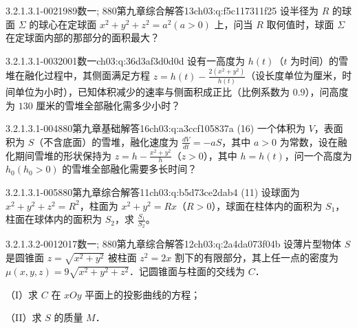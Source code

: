 \begin{q}{3.2.1.3.1-002}{1989数一; 880第九章综合解答13}{ch03:q:f5c117311f25}
设半径为 $R$ 的球面 $\Sigma$ 的球心在定球面 $x^2+y^2+z^2=a^2(a>0)$ 上，问当 $R$ 取何值时，球面 $\Sigma$ 在定球面内部的那部分的面积最大？
\end{q}

\begin{q}{3.2.1.3.1-003}{2001数一}{ch03:q:36d3af3d0d0d}
设有一高度为 $h(t)$（$t$ 为时间）的雪堆在融化过程中，其侧面满足方程 $z=h(t)-\frac{2(x^2+y^2)}{h(t)}$（设长度单位为厘米，时间单位为小时），已知体积减少的速率与侧面积成正比（比例系数为 $0.9$），问高度为 $130$ 厘米的雪堆全部融化需多少小时？
\end{q}

\begin{q}{3.2.1.3.1-004}{880第九章基础解答16}{ch03:q:a3ccf105837a}
(16) 一个体积为 $V$，表面积为 $S$（不含底面）的雪堆，融化速度为 $\frac{dV}{dt}=-aS$，其中 $a>0$ 为常数，设在融化期间雪堆的形状保持为 $z=h-\frac{x^2+y^2}{h}$（$z>0$），其中 $h=h(t)$，问一个高度为 $h_0(h_0>0)$ 的雪堆全部融化需要多长时间？
\end{q}

\begin{q}{3.2.1.3.1-005}{880第九章综合解答11}{ch03:q:b5d73ce2dab4}
(11) 设球面为 $x^2+y^2+z^2=R^2$，柱面为 $x^2+y^2=Rx$（$R>0$），球面在柱体内的面积为 $S_1$，柱面在球体内的面积为 $S_2$，求 $\frac{S_1}{S_2}$。
\end{q}

\par\addvspace{2.4ex}\noindent
\begin{minipage}{\linewidth}

\begin{q}{3.2.1.3.2-001}{2017数一; 880第九章综合解答12}{ch03:q:2a4da073f04b}
设薄片型物体 $S$ 是圆锥面 $z=\sqrt{x^2+y^2}$ 被柱面 $z^2=2x$ 割下的有限部分，其上任一点的密度为 $\mu(x,y,z)=9\sqrt{x^2+y^2+z^2}$．记圆锥面与柱面的交线为 $C$．

（I）求 $C$ 在 $xOy$ 平面上的投影曲线的方程；

（II）求 $S$ 的质量 $M$．
\end{q}
\end{minipage}


